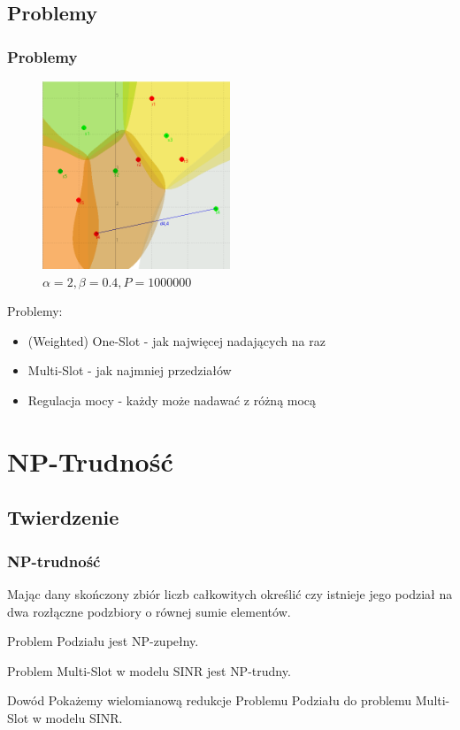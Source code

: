 \documentclass[polish, t,10pt]{beamer}
\begin{document}
\subsection{Problemy}
    \begin{frame}
        \frametitle{Problemy}
        \begin{figure}
            \includegraphics[width=0.5\textwidth]{pictures/model-diagram4.png}
            \caption{$\alpha=2, \beta=0.4, P=1000000$}
        \end{figure}
        Problemy:
        \begin{itemize}
            \item (Weighted) One-Slot - jak najwięcej nadających na raz
            \item Multi-Slot - jak najmniej przedziałów
            \item Regulacja mocy - każdy może nadawać z różną mocą
        \end{itemize}
    \end{frame}

\section{NP-Trudność}
\subsection{Twierdzenie}
\begin{frame}
    \frametitle{NP-trudność}
    \begin{definition}
        Mając dany skończony zbiór liczb całkowitych określić czy istnieje jego podział na dwa rozłączne podzbiory o równej sumie elementów.
    \end{definition}
    \pause
    \begin{fact}
        Problem Podziału jest NP-zupełny.
    \end{fact}
    \pause
    \begin{theorem}
        Problem Multi-Slot w modelu SINR jest NP-trudny.
    \end{theorem}
    \pause
    \begin{block}{Dowód}
        Pokażemy wielomianową redukcje Problemu Podziału do problemu Multi-Slot w modelu SINR.
    \end{block}
\end{frame}
\end{document}
